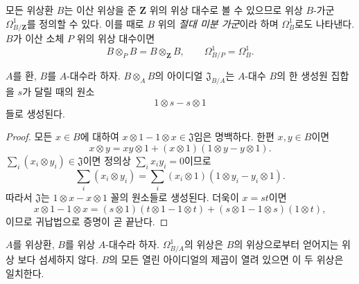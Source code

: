 모든 위상환 $B$는 이산 위상을 준 $\mathbf Z$ 위의 위상 대수로
볼 수 있으므로 위상 $B$-가군 $\Omega^1_{B/\mathbf Z}$를 정의할 수
있다. 이를 때로 $B$ 위의 \emph{절대 미분 가군}이라 하며
$\Omega^1_B$로도 나타낸다. $B$가 이산 소체 $P$ 위의 위상 대수이면
\[
  B\otimes_PB=B\otimes_{\mathbf Z}B,
  \qquad \Omega^1_{B/P}=\Omega^1_B.
\]

\begin{lemma}[20.4.4]
\label{0.20.4.4-ko}
$A$를 환, $B$를 $A$-대수라 하자. $B\otimes_A B$의 아이디얼
$\mathfrak J_{B/A}$는 $A$-대수 $B$의 한 생성원 집합을 $s$가 달릴
때의 원소
\[
  1\otimes s-s\otimes1
\]
들로 생성된다.
\end{lemma}

\begin{proof}
모든 $x\in B$에 대하여
$x\otimes1-1\otimes x\in\mathfrak J$임은 명백하다. 한편
$x,y\in B$이면
\[
  x\otimes y=xy\otimes1+(x\otimes1)(1\otimes y-y\otimes1).
\]
$\sum_i(x_i\otimes y_i)\in\mathfrak J$이면 정의상
$\sum_i x_iy_i=0$이므로
\begin{equation}
\tag{20.4.4.1}
\label{0.20.4.4.1-ko}
  \sum_i(x_i\otimes y_i)
  =\sum_i(x_i\otimes1)(1\otimes y_i-y_i\otimes1).
\end{equation}
따라서 $\mathfrak J$는
$1\otimes x-x\otimes1$ 꼴의 원소들로 생성된다. 더욱이 $x=st$이면
\begin{equation}
\tag{20.4.4.2}
\label{0.20.4.4.2-ko}
  x\otimes1-1\otimes x
  =(s\otimes1)(t\otimes1-1\otimes t)
   +(s\otimes1-1\otimes s)(1\otimes t),
\end{equation}
이므로 귀납법으로 증명이 곧 끝난다.
\end{proof}

\begin{proposition}[20.4.5]
\label{0.20.4.5-ko}
$A$를 위상환, $B$를 위상 $A$-대수라 하자.
$\Omega^1_{B/A}$의 위상은 $B$의 위상으로부터 얻어지는 위상
보다 섬세하지 않다. $B$의 모든 열린 아이디얼의
제곱이 열려 있으면 이 두 위상은 일치한다.
\end{proposition}

